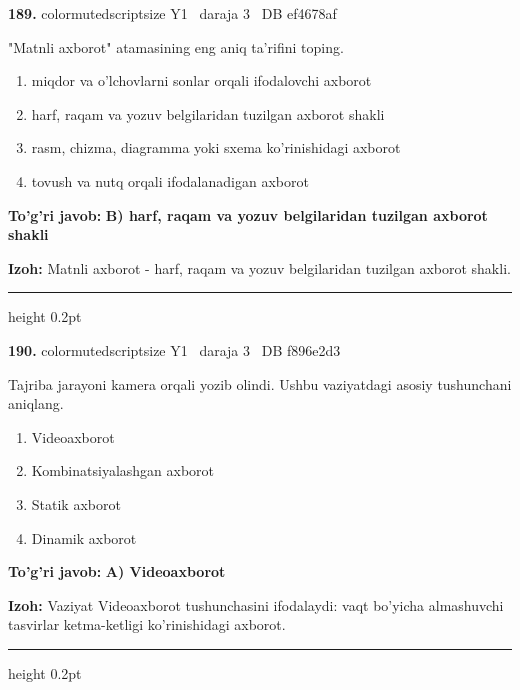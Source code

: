 \documentclass[10pt,a4paper,oneside]{article}
\begin{document}
\noindent\textbf{\color{ink}189.}  {color{muted}scriptsize Y1 \textbullet\ daraja 3 \textbullet\ DB ef4678af}
\par
"Matnli axborot" atamasining eng aniq ta'rifini toping.
\begin{enumerate}[label=\Alph*),leftmargin=9mm]
\item miqdor va o'lchovlarni sonlar orqali ifodalovchi axborot
\item harf, raqam va yozuv belgilaridan tuzilgan axborot shakli
\item rasm, chizma, diagramma yoki sxema ko'rinishidagi axborot
\item tovush va nutq orqali ifodalanadigan axborot
\end{enumerate}
\begin{tcolorbox}[enhanced,breakable,colback=teal!4,colframe=teal!50!black,boxrule=0.5pt,arc=1.1mm,left=3mm,right=3mm,top=1.7mm,bottom=1.7mm,before skip=2mm,after skip=2mm]
\textbf{\color{teal}To'g'ri javob:} \textbf{B) harf, raqam va yozuv belgilaridan tuzilgan axborot shakli}
\par\smallskip
\textbf{Izoh:} Matnli axborot - harf, raqam va yozuv belgilaridan tuzilgan axborot shakli.
\end{tcolorbox}
\vspace{2mm}\hrule height 0.2pt \vspace{3mm}

\noindent\textbf{\color{ink}190.}  {color{muted}scriptsize Y1 \textbullet\ daraja 3 \textbullet\ DB f896e2d3}
\par
Tajriba jarayoni kamera orqali yozib olindi. Ushbu vaziyatdagi asosiy tushunchani aniqlang.
\begin{enumerate}[label=\Alph*),leftmargin=9mm]
\item Videoaxborot
\item Kombinatsiyalashgan axborot
\item Statik axborot
\item Dinamik axborot
\end{enumerate}
\begin{tcolorbox}[enhanced,breakable,colback=teal!4,colframe=teal!50!black,boxrule=0.5pt,arc=1.1mm,left=3mm,right=3mm,top=1.7mm,bottom=1.7mm,before skip=2mm,after skip=2mm]
\textbf{\color{teal}To'g'ri javob:} \textbf{A) Videoaxborot}
\par\smallskip
\textbf{Izoh:} Vaziyat Videoaxborot tushunchasini ifodalaydi: vaqt bo'yicha almashuvchi tasvirlar ketma-ketligi ko'rinishidagi axborot.
\end{tcolorbox}
\vspace{2mm}\hrule height 0.2pt \vspace{3mm}
\end{document}
